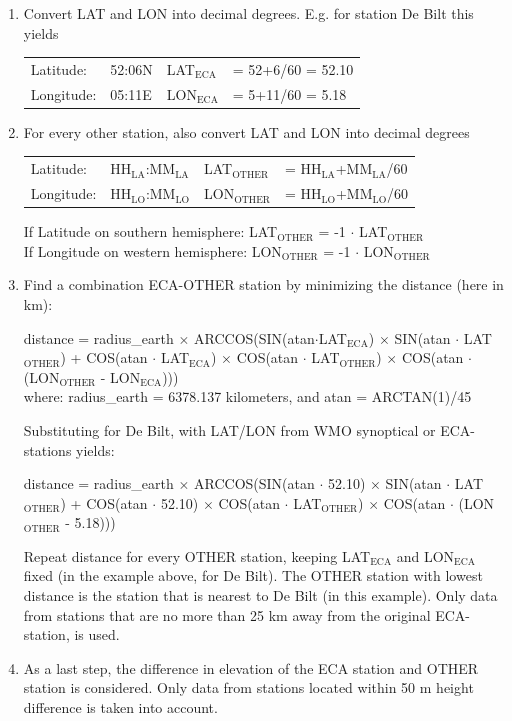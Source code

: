 \documentclass[a4paper,11pt]{article}
\begin{document}
\begin{enumerate}
\item Convert LAT and LON into decimal degrees. E.g. for station De
  Bilt this yields\\ 
\medskip

\begin{tabular}{l l l l}
Latitude:& 52:06N & LAT$_{\textrm{ECA}}$ &= 52+6/60 = 52.10\\
Longitude: &05:11E & LON$_{\textrm{ECA}}$ &= 5+11/60 = 5.18
\end{tabular}
\medskip

\item For every other station, also convert LAT and LON into decimal
degrees\\
\medskip

\begin{tabular}{l l l l}
Latitude: & HH$_{\textrm{LA}}$:MM$_{\textrm{LA}}$ &
LAT$_{\textrm{OTHER}}$ &= HH$_{\textrm{LA}}$+MM$_{\textrm{LA}}$/60\\
Longitude:& HH$_{\textrm{LO}}$:MM$_{\textrm{LO}}$ &
LON$_{\textrm{OTHER}}$ &= HH$_{\textrm{LO}}$+MM$_{\textrm{LO}}$/60
\end{tabular}
\medskip

If Latitude on southern hemisphere: LAT$_{\textrm{OTHER}}$ = -1 $\cdot$
LAT$_{\textrm{OTHER}}$\\
If Longitude on western hemisphere: LON$_{\textrm{OTHER}}$ = -1 $\cdot$ LON$_{\textrm{OTHER}}$
\medskip

\item Find a combination ECA-OTHER station by minimizing the distance
(here in km):
\medskip

 distance = radius\_earth $\times$
ARCCOS(SIN(atan$\cdot$LAT$_{\textrm{ECA}}$) $\times$
SIN(atan $\cdot$ LAT$_{\textrm{OTHER}}$) +
COS(atan $\cdot$ LAT$_{\textrm{ECA}}$) $\times$
COS(atan $\cdot$ LAT$_{\textrm{OTHER}}$) $\times$
COS(atan $\cdot$ (LON$_{\textrm{OTHER}}$ - LON$_{\textrm{ECA}}$)))\\
where: radius\_earth = 6378.137 kilometers, and atan = ARCTAN(1)/45
\medskip

Substituting for De Bilt, with LAT/LON from WMO synoptical or
ECA-stations yields:
\medskip

distance = radius\_earth $\times$
ARCCOS(SIN(atan $\cdot$ 52.10) $\times$
SIN(atan $\cdot$ LAT$_{\textrm{OTHER}}$) + COS(atan $\cdot$ 52.10) $\times$
COS(atan $\cdot$ LAT$_{\textrm{OTHER}}$) $\times$
COS(atan $\cdot$ (LON$_{\textrm{OTHER}}$ - 5.18)))
\medskip

Repeat distance for every OTHER station, keeping LAT$_{\textrm{ECA}}$
and LON$_{\textrm{ECA}}$ fixed (in the example above, for De
Bilt). The OTHER station with lowest distance is the station that is
nearest to De Bilt (in this example). Only data from stations that are
no more than 25 km away from the original ECA-station, is used.

\item As a last step, the difference in elevation of the ECA station
  and OTHER station is considered. Only data from stations located
  within 50 m height difference is taken into account.
\end{enumerate}
\end{document}
